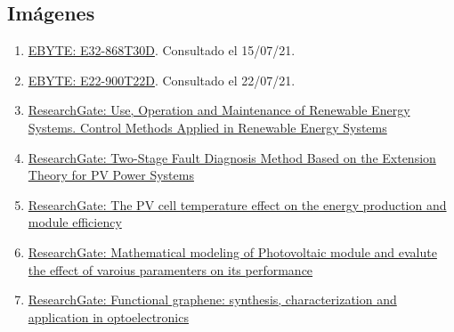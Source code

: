 \documentclass[12pt]{article}
\begin{document}
		\subsection*{Imágenes}
		
			\begin{enumerate}
				\item 
				\label{bib: imagen E32}
				\href{https://www.ebyte.com/en/product-view-news.aspx?id=189}{EBYTE: E32-868T30D}. Consultado el 15/07/21.
				
				\item 
				\label{bib: imagen E22}
				\href{https://www.ebyte.com/en/product-view-news.html?id=1117}{EBYTE: E22-900T22D}. Consultado el 22/07/21.
				
				\item
				\label{bib: research gate mppt curve} \href{https://www.researchgate.net/figure/Characteristic-curves-of-MPPT-a-power-voltage-curve-and-b-current-voltage-curve_fig7_278728718}{ResearchGate: Use, Operation and Maintenance of Renewable Energy Systems. Control Methods Applied in Renewable Energy Systems}
				
				\item 
				\label{bib: research gate pv power}
				\href{https://www.researchgate.net/figure/The-I-V-characteristic-curve-of-solar-cells-under-different-temperature_fig1_258388008}{ResearchGate: Two-Stage Fault Diagnosis Method Based on the Extension Theory for PV Power Systems}
				
				\item 
				\label{bib: research gate pv cell temp vs others}
				\href{https://www.researchgate.net/figure/The-PV-module-temperature-and-electrical-power-distribution-together-with-model-inputs_fig1_316548825}{ResearchGate: The PV cell temperature effect on the energy production and module efficiency}
				
				\item 
				\label{bib: research gate pv cell param}
				\href{https://www.researchgate.net/figure/I-V-characteristics-curve-of-a-PV-cell_fig2_313450163}{ResearchGate: Mathematical modeling of Photovoltaic module and evalute the effect of varoius paramenters on its performance}					
			
				\item 
				\label{bib: research gate JV curve solar panel}
				\href{https://www.researchgate.net/figure/J-V-characteristic-of-a-typical-solar-cell-in-the-dark-dashed-line-and-under_fig37_283662836}{ResearchGate: Functional graphene: synthesis, characterization and application in optoelectronics}
				

\end{enumerate}
\end{document}
